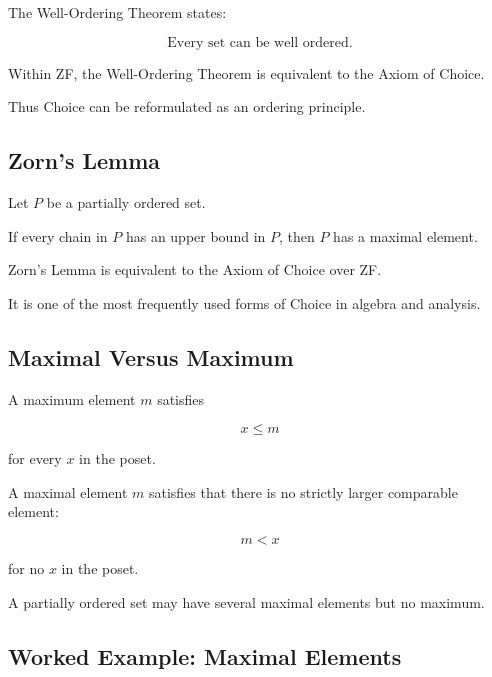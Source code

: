 The Well-Ordering Theorem states:

\[
\boxed{
\text{Every set can be well ordered.}
}
\]

Within ZF, the Well-Ordering Theorem is equivalent to the Axiom of Choice.

Thus Choice can be reformulated as an ordering principle.

\subsection{Zorn's Lemma}
\label{subsec:zorns-lemma}

\begin{theorem}
Let \(P\) be a partially ordered set.

If every chain in \(P\) has an upper bound in \(P\), then \(P\) has a
maximal element.
\end{theorem}

Zorn's Lemma is equivalent to the Axiom of Choice over ZF.

It is one of the most frequently used forms of Choice in algebra and
analysis.

\subsection{Maximal Versus Maximum}
\label{subsec:maximal-versus-maximum}

A maximum element \(m\) satisfies

\[
\boxed{
x\leq m
}
\]

for every \(x\) in the poset.

A maximal element \(m\) satisfies that there is no strictly larger
comparable element:

\[
\boxed{
m<x
}
\]

for no \(x\) in the poset.

A partially ordered set may have several maximal elements but no maximum.

\subsection{Worked Example: Maximal Elements}
\label{subsec:worked-maximal-elements}

